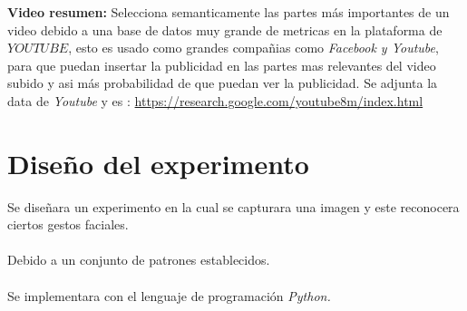 \documentclass{vgtc}                          %
\begin{document}
\textbf{Video resumen: }
Selecciona semanticamente las partes más importantes de un video
debido a una base de datos muy grande de metricas en la plataforma 
de $YOUTUBE$, esto es usado como grandes compañias como \textit{Facebook y Youtube}, para que puedan insertar la publicidad
en las partes mas relevantes del video subido y asi más probabilidad
de que puedan ver la publicidad.
\newline
\newline
Se adjunta la data de \textit{Youtube} y es : \newline \newline
\url{https://research.google.com/youtube8m/index.html}


\section{Diseño del experimento}

Se diseñara un experimento en la cual se capturara una imagen
y este reconocera ciertos gestos faciales.
\\
\\
Debido a un conjunto de patrones establecidos.
\\
\\
Se implementara con el lenguaje de programación \textit{Python.}




\end{document}
